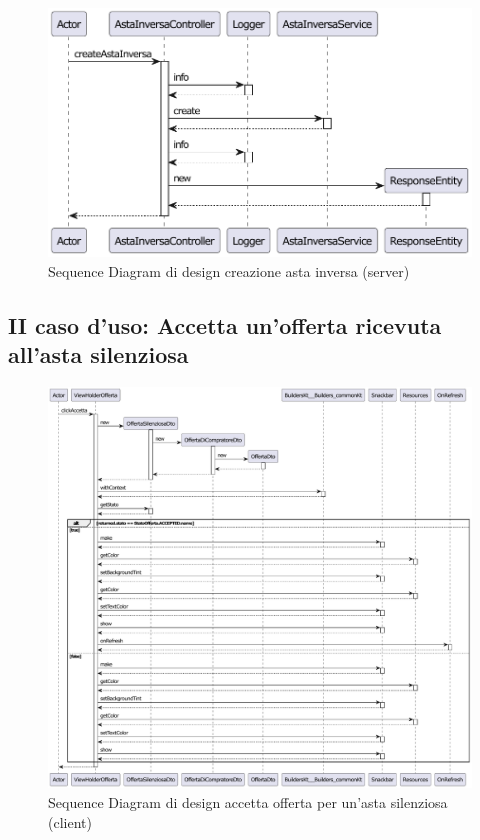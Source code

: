             \begin{figure}[htbp!]
                \centering
                    \includegraphics[width=1\linewidth]{Immagini/Diagrammi/Sequence Diagram/Design/Server Sequence Design/ServerSequenceCreaAstaDesign.pdf}
                \caption{Sequence Diagram di design creazione asta inversa (server)}
                \label{fig:Sequence Diagram di design creazione asta inversa (server)}
            \end{figure}

        \clearpage

        \subsection{II caso d'uso: Accetta un'offerta ricevuta all'asta silenziosa}
            \begin{figure}[htbp!]
                \centering
                    \includegraphics[width=1\linewidth]{Immagini/Diagrammi/Sequence Diagram/Design/Client Sequence Design/ClientSequenceAccettaOffertaDesign.pdf}
                \caption{Sequence Diagram di design accetta offerta per un'asta silenziosa (client)}
                \label{fig:Sequence Diagram di design accetta offerta per un'asta silenziosa (client)}
            \end{figure}

